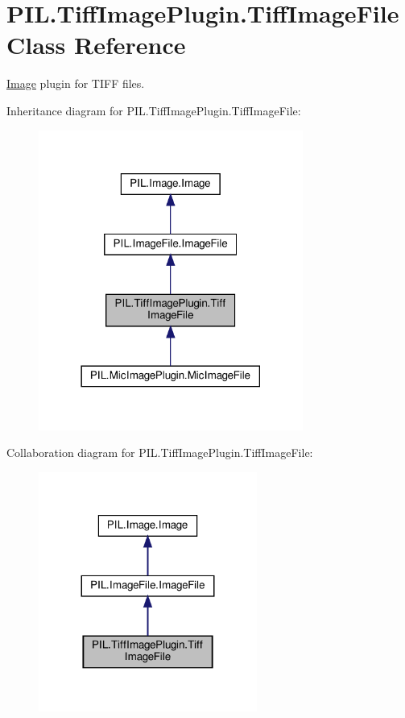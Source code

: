 \hypertarget{classPIL_1_1TiffImagePlugin_1_1TiffImageFile}{}\section{P\+I\+L.\+Tiff\+Image\+Plugin.\+Tiff\+Image\+File Class Reference}
\label{classPIL_1_1TiffImagePlugin_1_1TiffImageFile}


\hyperlink{namespacePIL_1_1Image}{Image} plugin for T\+I\+FF files.  




Inheritance diagram for P\+I\+L.\+Tiff\+Image\+Plugin.\+Tiff\+Image\+File\+:
\nopagebreak
\begin{figure}[H]
\begin{center}
\leavevmode
\includegraphics[width=246pt]{classPIL_1_1TiffImagePlugin_1_1TiffImageFile__inherit__graph}
\end{center}
\end{figure}


Collaboration diagram for P\+I\+L.\+Tiff\+Image\+Plugin.\+Tiff\+Image\+File\+:
\nopagebreak
\begin{figure}[H]
\begin{center}
\leavevmode
\includegraphics[width=203pt]{classPIL_1_1TiffImagePlugin_1_1TiffImageFile__coll__graph}
\end{center}
\end{figure}
